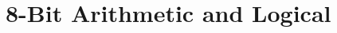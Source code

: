 \documentclass[12pt,twoside,openright,a4paper]{book}
\begin{document}
\newcommand{\FlagsRLA}[1][]{\Flags[#1]{\FN}{\FN}{0}{\FN}{0}{\FS}}
\newcommand{\FlagsRLCr}[1][]{\Flags[#1]{\FS}{\FS}{0}{\FlagsFPP}{0}{\FS}}
\newcommand{\FlagsRLCA}[1][]{\Flags[#1]{\FN}{\FN}{0}{\FN}{0}{\FS}}
\newcommand{\FlagsRLD}[1][]{\Flags[#1]{\FS}{\FS}{0}{\FlagsFPP}{0}{\FN}}
\newcommand{\FlagsRRr}[1][]{\Flags[#1]{\FS}{\FS}{0}{\FlagsFPP}{0}{\FS}}
\newcommand{\FlagsRRA}[1][]{\Flags[#1]{\FN}{\FN}{0}{\FN}{0}{\FS}}
\newcommand{\FlagsRRCr}[1][]{\Flags[#1]{\FS}{\FS}{0}{\FlagsFPP}{0}{\FS}}
\newcommand{\FlagsRRCA}[1][]{\Flags[#1]{\FN}{\FN}{0}{\FN}{0}{\FS}}
\newcommand{\FlagsRRD}[1][]{\Flags[#1]{\FS}{\FS}{0}{\FlagsFPP}{0}{\FN}}
\newcommand{\FlagsRSTn}[1][]{\Flags[#1]{\FN}{\FN}{\FN}{\FN}{\FN}{\FN}}
\newcommand{\FlagsSBCr}[1][]{\Flags[#1]{\FS}{\FS}{\FS}{\FlagsFPV}{1}{\FS}}
\newcommand{\FlagsSBCrr}[1][]{\Flags[#1]{\FS\FlagsSee{1}}{\FS\FlagsSee{1}}{\FX\FlagsSee{2}}{\FlagsFPV\FlagsSee{1}}{1}{\FS\FlagsSee{1}}}
\newcommand{\FlagsSCF}[1][]{\Flags[#1]{\FN}{\FN}{0}{\FN}{0}{1}}
\newcommand{\FlagsSETr}[1][]{\Flags[#1]{\FN}{\FN}{\FN}{\FN}{\FN}{\FN}}
\newcommand{\FlagsSETAE}[1][]{\Flags[#1]{\FN}{\FN}{\FN}{\FN}{\FN}{\FN}}
\newcommand{\FlagsSLAr}[1][]{\Flags[#1]{\FS}{\FS}{0}{\FlagsFPP}{0}{\FS}}
\newcommand{\FlagsSLIr}[1][]{\Flags[#1]{\FS}{\FS}{0}{\FlagsFPP}{0}{\FS}}
\newcommand{\FlagsSRAr}[1][]{\Flags[#1]{\FS}{\FS}{0}{\FlagsFPP}{0}{\FS}}
\newcommand{\FlagsSRLr}[1][]{\Flags[#1]{\FS}{\FS}{0}{\FlagsFPP}{0}{\FS}}
\newcommand{\FlagsSUBr}[1][]{\Flags[#1]{\FS}{\FS}{\FS}{\FlagsFPV}{1}{\FS}}
\newcommand{\FlagsSWAPNIB}[1][]{\Flags[#1]{\FN}{\FN}{\FN}{\FN}{\FN}{\FN}}
\newcommand{\FlagsTESTn}[1][]{\Flags[#1]{\FS}{\FS}{\FS}{\FlagsFPV}{\FU}{\FS}}
\newcommand{\FlagsXORr}[1][]{\Flags[#1]{\FS}{\FS}{0}{\FlagsFPP}{0}{0}}

\section{8-Bit Arithmetic and Logical}
\end{document}
